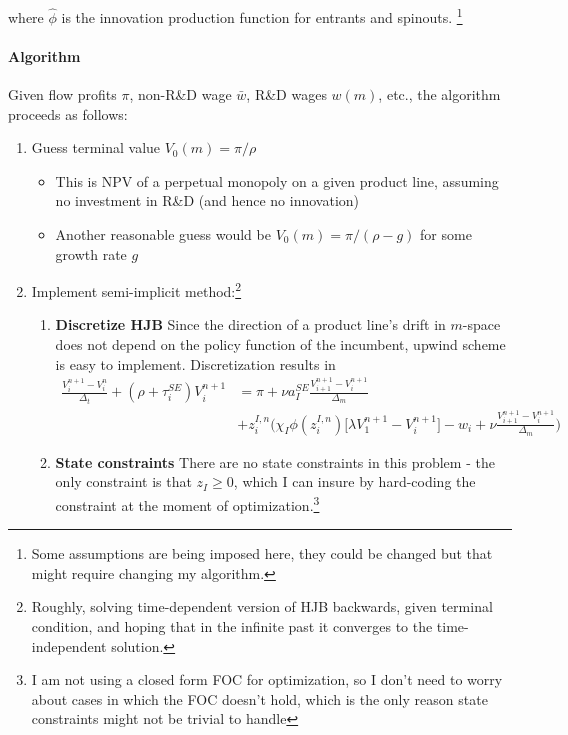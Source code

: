 \documentclass[12pt,english]{article}
\theoremstyle{remark}
\begin{document}
where $\hat{\phi}$ is the innovation production function for entrants and spinouts. \footnote{Some assumptions are being imposed here, they could be changed but that might require changing my algorithm.} 

\paragraph{Algorithm} Given flow profits $\pi$, non-R\&D wage $\bar{w}$, R\&D wages $w(m)$, etc., the algorithm proceeds as follows:

\begin{enumerate}
	\item Guess terminal value $V_0(m) = \pi / \rho$
	\begin{itemize}
		\item This is NPV of a perpetual monopoly on a given product line, assuming no investment in R\&D (and hence no innovation)
		\item Another reasonable guess would be $V_0(m) = \pi / (\rho - g)$ for some growth rate $g$
	\end{itemize}
	\item Implement semi-implicit method:\footnote{Roughly, solving time-dependent version of HJB backwards, given terminal condition, and hoping that in the infinite past it converges to the time-independent solution.}
	\begin{enumerate}
		\item \textbf{Discretize HJB} Since the direction of a product line's drift in $m$-space does not depend on the policy function of the incumbent, upwind scheme is easy to implement. Discretization results in
		\begin{align*}
			\frac{V_i^{n+1} - V_i^{n}}{\Delta_t} + (\rho + \tau^{SE}_i)V_i^{n+1} &= \pi + \nu a_I^{SE} \frac{V_{i+1}^{n+1} - V_i^{n+1}}{\Delta_m} \\
			          &+ z^{I,n}_i \Big( \chi_I \phi(z^{I,n}_i) \big[ \lambda V^{n+1}_1 - V^{n+1}_i \big] - w_i + \nu \frac{V_{i+1}^{n+1} - V_i^{n+1}}{\Delta_m} \Big)
		\end{align*}
		\item \textbf{State constraints} There are no state constraints in this problem - the only constraint is that $z_I \ge 0$, which I can insure by hard-coding the constraint at the moment of optimization.\footnote{I am not using a closed form FOC for optimization, so I don't need to worry about cases in which the FOC doesn't hold, which is the only reason state constraints might not be trivial to handle}

\end{enumerate}
\end{enumerate}
\end{document}
